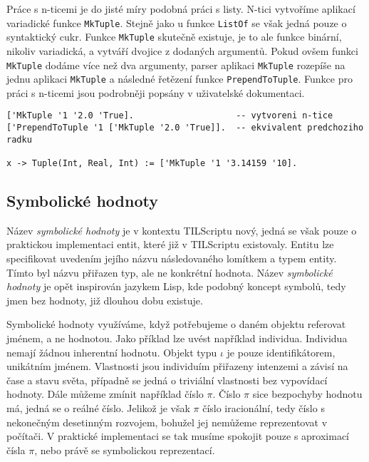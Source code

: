 Práce s n-ticemi je do jisté míry podobná práci s listy. N-tici vytvoříme aplikací variadické
funkce \lstinline{MkTuple}. Stejně jako u funkce \lstinline{ListOf} se však jedná pouze o
syntaktický cukr. Funkce \lstinline{MkTuple} skutečně existuje, je to ale funkce binární, nikoliv
variadická, a vytváří dvojice z dodaných argumentů. Pokud ovšem funkci \lstinline{MkTuple} dodáme
více než dva argumenty, parser aplikaci \lstinline{MkTuple} rozepíše na jednu aplikaci
\lstinline{MkTuple} a následné řetězení funkce \lstinline{PrependToTuple}. Funkce pro práci
s n-ticemi jsou podrobněji popsány v uživatelské dokumentaci.
 
\begin{lstlisting}[caption={Příklad využití n-tic}]
['MkTuple '1 '2.0 'True].                    -- vytvoreni n-tice
['PrependToTuple '1 ['MkTuple '2.0 'True]].  -- ekvivalent predchoziho radku

x -> Tuple(Int, Real, Int) := ['MkTuple '1 '3.14159 '10].
\end{lstlisting}

\subsection{Symbolické hodnoty} \label{symbolic-values}

Název \textit{symbolické hodnoty} je v kontextu TILScriptu nový, jedná se však pouze o praktickou
implementaci entit, které již v TILScriptu existovaly. Entitu lze specifikovat uvedením jejího
názvu následovaného lomítkem a typem entity. Tímto byl názvu přiřazen typ, ale ne konkrétní
hodnota. Název \textit{symbolické hodnoty} je opět inspirován jazykem Lisp, kde podobný koncept
symbolů, tedy jmen bez hodnoty, již dlouhou dobu existuje.

Symbolické hodnoty využíváme, když potřebujeme o daném objektu referovat jménem, a ne hodnotou.
Jako příklad lze uvést například individua. Individua nemají žádnou inherentní hodnotu. Objekt
typu $\iota$ je pouze identifikátorem, unikátním jménem. Vlastnosti jsou individuím přiřazeny
intenzemi a závisí na čase a stavu světa, případně se jedná o triviální vlastnosti bez vypovídací
hodnoty. Dále můžeme zmínit například číslo $\pi$. Číslo $\pi$ sice bezpochyby hodnotu má, jedná
se o reálné číslo. Jelikož je však $\pi$ číslo iracionální, tedy číslo s nekonečným desetinným
rozvojem, bohužel jej nemůžeme reprezentovat v počítači. V praktické implementaci se tak musíme
spokojit pouze s aproximací čísla $\pi$, nebo právě se symbolickou reprezentací.

